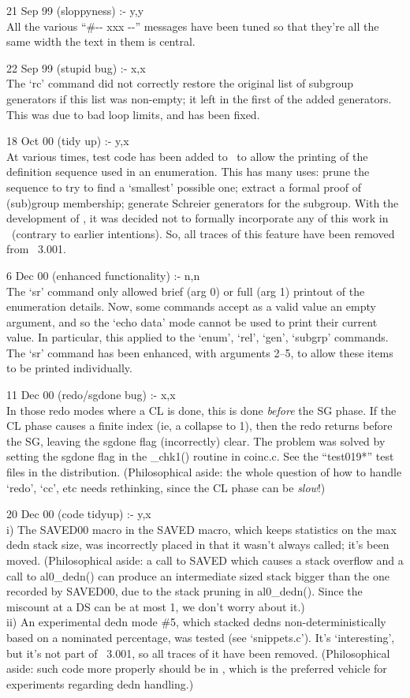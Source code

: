 21 Sep 99 (sloppyness) :- y,y \\
All the various ``\#-{}- xxx -{}-'' messages have been tuned so that
  they're all the same width \amp the text in them is central.

22 Sep 99 (stupid bug) :- x,x \\
The `rc' command did not correctly restore the original list of subgroup
  generators if this list was non-empty; it left in the first of the
  added generators.
This was due to bad loop limits, and has been fixed.

18 Oct 00 (tidy up) :- y,x \\
At various times, test code has been added to \ace\ to allow the printing
  of the definition sequence used in an enumeration.
This has many uses:
  prune the sequence to try to find a `smallest' possible one;
  extract a formal proof of (sub)group membership;
  generate Schreier generators for the subgroup.
With the development of \peace, it was decided not to formally incorporate
  any of this work in \ace\ (contrary to earlier intentions).
So, all traces of this feature have been removed from \ace\ 3.001.

6 Dec 00 (enhanced functionality) :- n,n \\
The `sr' command only allowed brief (arg 0) or full (arg 1) printout of the
  enumeration details.
Now, some commands accept as a valid value an empty argument, and so the 
  `echo data' mode cannot be used to print their current value.
In particular, this applied to the `enum', `rel', `gen', `subgrp' commands.
The `sr' command has been enhanced, with arguments 2--5, to allow these 
  items to be printed individually.

11 Dec 00 (redo/sgdone bug) :- x,x \\
In those redo modes where a CL is done, this is done \emph{before} the SG
  phase.
If the CL phase causes a finite index (ie, a collapse to 1), then the
  redo returns before the SG, leaving the sgdone flag (incorrectly) clear.
The problem was solved by setting the sgdone flag in the \_chk1() routine
  in coinc.c.
See the ``test019*'' test files in the distribution.
(Philosophical aside: the whole question of how to handle `redo', `cc', etc
  needs rethinking, since the CL phase can be \emph{slow}!)

20 Dec 00 (code tidyup) :- y,x \\
i) The SAVED00 macro in the SAVED macro, which keeps statistics on the max
  dedn stack size, was incorrectly placed in that it wasn't always called;
  it's been moved.
(Philosophical aside: a call to SAVED which causes a stack overflow and a
  call to al0\_dedn() can produce an intermediate sized stack bigger than
  the one recorded by SAVED00, due to the stack pruning in al0\_dedn().
Since the miscount at a DS can be at most 1, we don't worry about it.) \\
ii) An experimental dedn mode \#5, which stacked dedns 
  non-deterministically based on a nominated percentage, was tested (see
  `snippets.c').
It's `interesting', but it's not part of \ace\ 3.001, so all traces of it
  have been removed.
(Philosophical aside: such code more properly should be in \pace, which is
  the preferred vehicle for experiments regarding dedn handling.)

